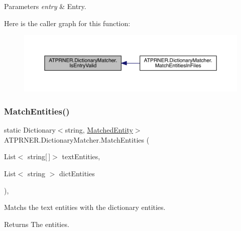 \begin{DoxyParams}{Parameters}
{\em entry} & Entry.\\
\hline
\end{DoxyParams}
Here is the caller graph for this function\+:
\nopagebreak
\begin{figure}[H]
\begin{center}
\leavevmode
\includegraphics[width=350pt]{d0/d6a/class_a_t_p_r_n_e_r_1_1_dictionary_matcher_a98d35fff3cf9f96fa1267ebdff6773d5_icgraph}
\end{center}
\end{figure}
\hypertarget{class_a_t_p_r_n_e_r_1_1_dictionary_matcher_aa6fdeaf3a88c14b5ed8e4f452d1c3c17}{}\label{class_a_t_p_r_n_e_r_1_1_dictionary_matcher_aa6fdeaf3a88c14b5ed8e4f452d1c3c17} 
\subsubsection{\texorpdfstring{Match\+Entities()}{MatchEntities()}}
{\footnotesize\ttfamily static Dictionary$<$string, \hyperlink{class_a_t_p_r_n_e_r_1_1_matched_entity}{Matched\+Entity}$>$ A\+T\+P\+R\+N\+E\+R.\+Dictionary\+Matcher.\+Match\+Entities (\begin{DoxyParamCaption}\item[{List$<$ string\mbox{[}$\,$\mbox{]}$>$}]{text\+Entities,  }\item[{List$<$ string $>$}]{dict\+Entities }\end{DoxyParamCaption})\hspace{0.3cm}{\ttfamily [inline]}, {\ttfamily [static]}}



Matchs the text entities with the dictionary entities. 

\begin{DoxyReturn}{Returns}
The entities.
\end{DoxyReturn}

